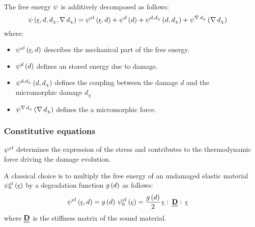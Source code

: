 The free energy \(\psi\) is additively decomposed as follows:
\begin{equation}
  \label{eq:ef_micromorphic:formulation:freeenergy_split}
  \psi\left(\underline{\epsilon}, d, d_{\chi}, \nabla\,d_{\chi}\right)=
  {\psi}^{el}\left(\underline{\epsilon}, d\right)+
  {\psi}^{d}\left(d\right)+
  {\psi}^{d, d_{\chi}}\left(d, d_{\chi}\right)+
  {\psi}^{\nabla\,d_{\chi}}\left(\nabla\,d_{\chi}\right)
\end{equation}
where:

\begin{itemize}
    \item \({\psi}^{el}\left(\underline{\epsilon}, d\right)\) describes the mechanical part of
    the free energy.
    \item \({\psi}^{d}\left(d\right)\) defines an stored energy due to damage.
    \item \({\psi}^{d, d_{\chi}}\left(d, d_{\chi}\right)\) defines the coupling between
    the damage \(d\) and the micromorphic damage \(d_{\chi}\)
    \item \({\psi}^{\nabla\,d_{\chi}}\left(\nabla\, d_{\chi}\right)\) defines the a
    micromorphic force.
\end{itemize}

\subsubsection{Constitutive equations}

${\psi}^{el}$ determines the expression of the stress and contributes
to the thermodynamic force driving the damage evolution.

A classical choice is to multiply the free energy of an undamaged
elastic material \({\psi}^{el}_{0}\left(\underline{\epsilon}\right)\) by a degradation
function \(g\left(d\right)\) as follows:
\begin{equation}
  \label{eq:micromorphicdamage:freeenergygel}
  {\psi}^{el}\left(\underline{\epsilon}, d\right) = 
  g\left(d\right)\,{\psi}^{el}_{0}\left(\underline{\epsilon}\right) = \displaystyle \frac{\displaystyle g\left(d\right)}{\displaystyle 2}\,\underline{\epsilon}\,\colon\,\underline{\underline{\mathbf{D}}}\,\colon\,\underline{\epsilon}
\end{equation}
where \(\underline{\underline{\mathbf{D}}}\) is the stiffness matrix of the sound material.


